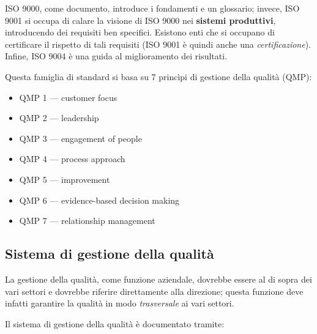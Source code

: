 \documentclass[a4paper]{article}
\begin{document}
ISO 9000, come documento, introduce i fondamenti e un glossario; invece, ISO 9001 si occupa di calare la visione di ISO 9000 nei \textbf{sistemi produttivi}, introducendo dei requisiti ben specifici. Esistono enti che si occupano di certificare il rispetto di tali requisiti (ISO 9001 è quindi anche una \emph{certificazione}). Infine, ISO 9004 è una guida al miglioramento dei risultati.
		
Questa famiglia di standard si basa su 7 princìpi di gestione della qualità (QMP):
		
	\begin{itemize}
		
			
	\item QMP 1 --- customer focus
			
	\item QMP 2 --- leadership
			
	\item QMP 3 --- engagement of people
			
	\item QMP 4 --- process approach
			
	\item QMP 5 --- improvement
			
	\item QMP 6 --- evidence-based decision making
			
	\item QMP 7 --- relationship management
		
	\end{itemize}


		
	\subsection{Sistema di gestione della qualità}

		
La gestione della qualità, come funzione aziendale, dovrebbe essere al di sopra dei vari settori e dovrebbe riferire direttamente alla direzione; questa funzione deve infatti garantire la qualità in modo \emph{trasversale} ai vari settori.
		
Il sistema di gestione della qualità è documentato tramite:
		
\end{document}
